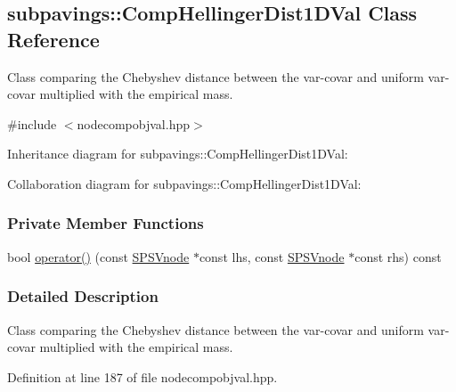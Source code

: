 \hypertarget{classsubpavings_1_1CompHellingerDist1DVal}{\subsection{subpavings\-:\-:\-Comp\-Hellinger\-Dist1\-D\-Val \-Class \-Reference}
\label{classsubpavings_1_1CompHellingerDist1DVal}
}


\-Class comparing the \-Chebyshev distance between the var-\/covar and uniform var-\/covar multiplied with the empirical mass.  




{\ttfamily \#include $<$nodecompobjval.\-hpp$>$}



\-Inheritance diagram for subpavings\-:\-:\-Comp\-Hellinger\-Dist1\-D\-Val\-:


\-Collaboration diagram for subpavings\-:\-:\-Comp\-Hellinger\-Dist1\-D\-Val\-:
\subsubsection*{\-Private \-Member \-Functions}
\begin{DoxyCompactItemize}
\item 
bool \hyperlink{classsubpavings_1_1CompHellingerDist1DVal_a1524699368b7aa549e599257c4b5b0a6}{operator()} (const \hyperlink{classsubpavings_1_1SPSVnode}{\-S\-P\-S\-Vnode} $\ast$const lhs, const \hyperlink{classsubpavings_1_1SPSVnode}{\-S\-P\-S\-Vnode} $\ast$const rhs) const 
\end{DoxyCompactItemize}


\subsubsection{\-Detailed \-Description}
\-Class comparing the \-Chebyshev distance between the var-\/covar and uniform var-\/covar multiplied with the empirical mass. 

\-Definition at line 187 of file nodecompobjval.\-hpp.



